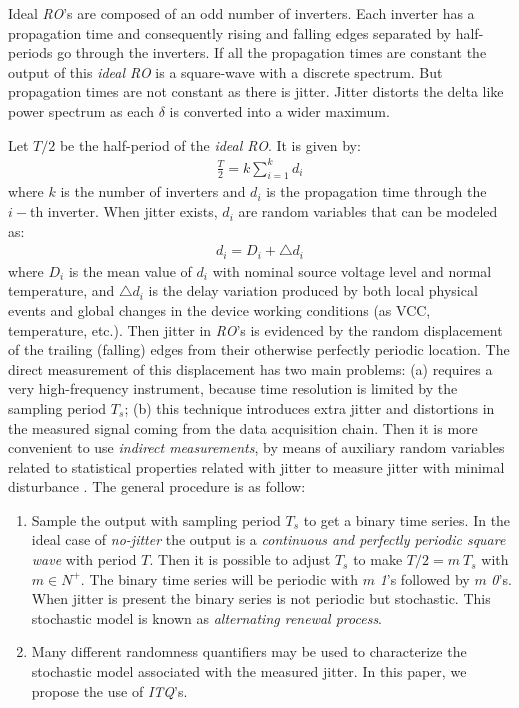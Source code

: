 Ideal \emph{RO}'s are composed of an odd number of inverters. Each inverter has a propagation time and consequently rising and falling edges separated by half-periods go through the inverters. If all the propagation times are constant the output of this \emph{ideal RO} is a square-wave with a discrete spectrum. But propagation times are not constant as there is jitter. Jitter distorts the delta like power spectrum as each $\delta$ is converted into a wider maximum. 

Let $T/2$ be the half-period of the \emph{ideal RO}. It is given by:
%
\begin{eqnarray}
\frac{T}{2}=k \sum_{i=1}^{k}d_i
\end{eqnarray}
%
where $k$ is the number of inverters and $d_i$ is the propagation time through the $i-$th inverter. When jitter exists, $d_i$ are random variables that can be modeled as:
%
\begin{eqnarray}
d_i=D_i+ \bigtriangleup d_i
\end{eqnarray}
%
where $D_i$ is the mean value of $d_i$ with nominal source voltage level and normal temperature, and $\bigtriangleup d_i$ is the delay variation produced by both local physical events and global changes in the device working conditions (as VCC, temperature, etc.). Then jitter in \emph{RO}'s is evidenced by the random displacement of the trailing (falling) edges from their otherwise perfectly periodic location. The direct measurement of this displacement has two main problems: (a) requires a very high-frequency instrument, because time resolution is limited by the sampling period $T_s$; (b) this technique introduces extra jitter and distortions in the measured signal coming from the data acquisition chain. Then it is more convenient to use \emph{indirect measurements}, by means of auxiliary random variables related to statistical properties related with jitter to measure jitter with minimal disturbance \cite{Lubicz2014}. The general procedure is as follow:
\begin{enumerate}
\label{list:altrenew}
\item Sample the output with sampling period $T_s$ to get a binary time series. 
In the ideal case of \emph{no-jitter} the output is a \emph{continuous and perfectly periodic square wave} with period $T$. Then it is possible to adjust $T_s$ to make $T/2=m~T_s$ with $m\in N^+$. The binary time series will be periodic with $m$ \emph{1}'s followed by $m$ \emph{0}'s. When jitter is present the binary series is not periodic but stochastic. This stochastic model is known as \emph{alternating renewal process}.
\item Many different randomness quantifiers may be used to characterize the stochastic model associated with the measured jitter. In this paper, we propose the use of \emph{ITQ}'s. 
\end{enumerate}
